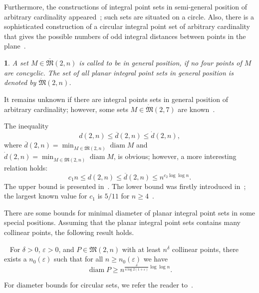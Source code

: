 \documentclass[11pt,twoside,draft
]{article}
\newtheorem{Definition}{\indent {\sc Definition}}
\renewcommand*{\&}{\textbackslash \symbol{38}}%
\begin{document}
Furthermore, the constructions of integral point sets in semi-general position of arbitrary cardinality
appeared~\cite{harborth1993upper};
such sets are situated on a circle.
Also, there is a sophisticated construction of a circular integral point set of arbitrary cardinality
that gives the possible numbers of odd integral distances
between points in the plane~\cite{piepmeyer1996maximum}.


\begin{Definition}
	A set $M\in\overline{\mathfrak{M}}(2,n)$ is called to be in \textit{general position},
	if no four points of $M$ are concyclic.
	The set of all planar integral point sets in general position
	is denoted by $\dot{\mathfrak{M}}(2,n)$.
\end{Definition}

It remains unknown if there are integral points sets in general position of arbitrary cardinality;
however, some sets $M\in \dot{\mathfrak{M}}(2,7)$ are known~\cite{kreisel2008heptagon,kurz2013constructing}.

The inequality
\begin{equation*}
	d(2,n) \leq \overline{d}(2,n) \leq \dot{d}(2,n)
	,
\end{equation*}
where
$
	\overline{d}(2,n) = \min_{M\in\overline{\mathfrak{M}}(2,n)} \operatorname{diam} M
$
and
$
	\dot{d}(2,n) = \min_{M\in\dot{\mathfrak{M}}(2,n)} \operatorname{diam} M
$,
is obvious; however, a more interesting relation holds:
\begin{equation*}
	c_1 n \leq d(2,n) \leq \overline{d}(2,n) \leq n^{c_2 \log \log n}
	.
\end{equation*}
The upper bound is presented in~\cite{harborth1993upper}.
The lower bound was firstly introduced in~\cite{solymosi2003note};
the largest known value for $c_1$ is $5/11$ for $n\geq 4$~\cite{my-pps-linear-bound-2019}.


There are some bounds for minimal diameter of planar integral point sets in some special positions.
Assuming that the planar integral point sets contains many collinear points,
the following result holds.
\begin{Theorem}~\cite[Theorem 4]{kurz2008minimum}
	For $\delta > 0$, $\varepsilon > 0$, and $P\in\mathfrak{M}(2,n)$ with
	at least $n^\delta$ collinear points, there exists a $n_0 (\varepsilon)$
	such that for all $n \geq n_0 (\varepsilon)$ we have
	\begin{equation}
		\operatorname{diam} P \geq n^{\frac{\delta}{4 \log 2(1+\varepsilon)}\log \log n}
		.
	\end{equation}
\end{Theorem}
For diameter bounds for circular sets, we refer the reader to~\cite{bat2018number}.
\end{document}
